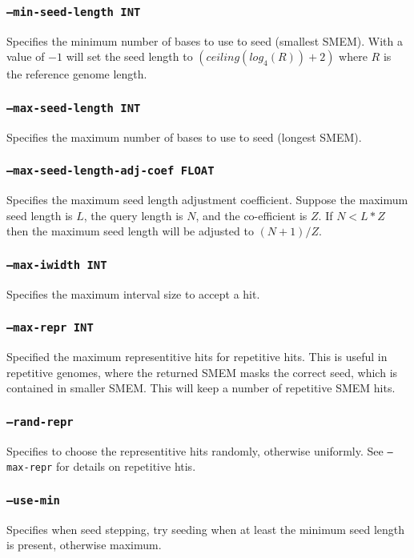 \documentclass[a4paper,12pt]{book}
\newcommand{\TT}[1]{{\tt #1}} %
\begin{document}
\subsubsection{\TT{--min-seed-length INT}}
Specifies the minimum number of bases to use to seed (smallest SMEM).
With a value of $-1$ will set the seed length to $\left(ceiling(log_4(R)) + 2\right)$ where $R$ is the reference genome length.

\subsubsection{\TT{--max-seed-length INT}}
Specifies the maximum number of bases to use to seed (longest SMEM).

\subsubsection{\TT{--max-seed-length-adj-coef FLOAT}}
Specifies the maximum seed length adjustment coefficient.
Suppose the maximum seed length is $L$, the query length is $N$, and the co-efficient is $Z$.
If $N < L * Z$ then the maximum seed length will be adjusted to $(N + 1) / Z$. 

\subsubsection{\TT{--max-iwidth INT}}
Specifies the maximum interval size to accept a hit.

\subsubsection{\TT{--max-repr INT}}
Specified the maximum representitive hits for repetitive hits.
This is useful in repetitive genomes, where the returned SMEM masks the correct seed, which is contained in smaller SMEM.
This will keep a number of repetitive SMEM hits.

\subsubsection{\TT{--rand-repr}}
Specifies to choose the representitive hits randomly, otherwise uniformly.
See \TT{--max-repr} for details on repetitive htis.

\subsubsection{\TT{--use-min}}
Specifies when seed stepping, try seeding when at least the minimum seed length is present, otherwise maximum.
\end{document}
